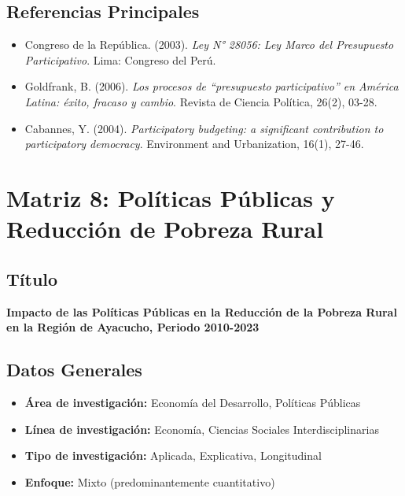 \documentclass[
  man,
  floatsintext,
  longtable,
  a4paper,
  nolmodern,
  notxfonts,
  notimes,
  12pt,
  colorlinks=true,linkcolor=blue,citecolor=blue,urlcolor=blue]{apa7}
\providecommand{\tightlist}{%
  \setlength{\itemsep}{0pt}\setlength{\parskip}{0pt}}
\begin{document}
\subsection{Referencias Principales}\label{referencias-principales-6}

\begin{itemize}
\tightlist
\item
  Congreso de la República. (2003). \emph{Ley N° 28056: Ley Marco del
  Presupuesto Participativo}. Lima: Congreso del Perú.
\item
  Goldfrank, B. (2006). \emph{Los procesos de ``presupuesto
  participativo'' en América Latina: éxito, fracaso y cambio}. Revista
  de Ciencia Política, 26(2), 03-28.
\item
  Cabannes, Y. (2004). \emph{Participatory budgeting: a significant
  contribution to participatory democracy}. Environment and
  Urbanization, 16(1), 27-46.
\end{itemize}

\section{Matriz 8: Políticas Públicas y Reducción de Pobreza
Rural}\label{matriz-8-poluxedticas-puxfablicas-y-reducciuxf3n-de-pobreza-rural}

\subsection{Título}\label{tuxedtulo-7}

\textbf{Impacto de las Políticas Públicas en la Reducción de la Pobreza
Rural en la Región de Ayacucho, Periodo 2010-2023}

\subsection{Datos Generales}\label{datos-generales-7}

\begin{itemize}
\tightlist
\item
  \textbf{Área de investigación:} Economía del Desarrollo, Políticas
  Públicas
\item
  \textbf{Línea de investigación:} Economía, Ciencias Sociales
  Interdisciplinarias
\item
  \textbf{Tipo de investigación:} Aplicada, Explicativa, Longitudinal
\item
  \textbf{Enfoque:} Mixto (predominantemente cuantitativo)
\end{itemize}
\end{document}
